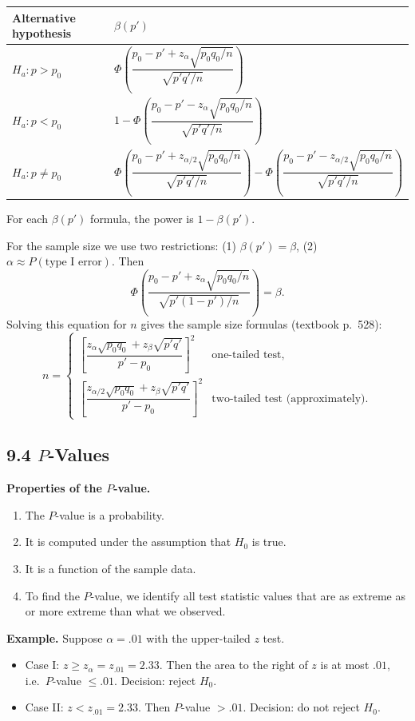 \begin{center}
\begin{tabular}{ll}
\toprule
Alternative hypothesis & $\beta(p')$\\
\midrule
$H_a:p>p_0$   & $\Phi\!\left(\dfrac{p_0-p'+z_\alpha\sqrt{p_0q_0/n}}{\sqrt{p'q'/n}}\right)$\\[3ex]
$H_a:p<p_0$   & $1-\Phi\!\left(\dfrac{p_0-p'-z_\alpha\sqrt{p_0q_0/n}}{\sqrt{p'q'/n}}\right)$\\[3ex]
$H_a:p\ne p_0$ & $\Phi\!\left(\dfrac{p_0-p'+z_{\alpha/2}\sqrt{p_0q_0/n}}{\sqrt{p'q'/n}}\right) - \Phi\!\left(\dfrac{p_0-p'-z_{\alpha/2}\sqrt{p_0q_0/n}}{\sqrt{p'q'/n}}\right)$\\
\bottomrule
\end{tabular}
\end{center}
For each $\beta(p')$ formula, the power is $1-\beta(p')$.

For the sample size we use two restrictions: (1) $\beta(p')=\beta$, (2) $\alpha\approx P(\text{type I error})$. Then
\[
\Phi\!\left(\frac{p_0-p'+z_\alpha\sqrt{p_0q_0/n}}{\sqrt{p'(1-p')/n}}\right)=\beta .
\]
Solving this equation for $n$ gives the sample size formulas (textbook p.~528):
\[
n = \begin{cases}
\left[\dfrac{z_\alpha\sqrt{p_0q_0}+z_\beta\sqrt{p'q'}}{p'-p_0}\right]^2 & \text{one-tailed test},\\[3ex]
\left[\dfrac{z_{\alpha/2}\sqrt{p_0q_0}+z_\beta\sqrt{p'q'}}{p'-p_0}\right]^2 & \text{two-tailed test (approximately)}.
\end{cases}
\]

\subsection*{9.4 $P$-Values}

\textbf{Properties of the $P$-value.}
\begin{enumerate}
  \item The $P$-value is a probability.
  \item It is computed under the assumption that $H_0$ is true.
  \item It is a function of the sample data.
  \item To find the $P$-value, we identify all test statistic values that are as extreme as or more extreme than what we observed.
\end{enumerate}

\textbf{Example.} Suppose $\alpha=.01$ with the upper-tailed $z$ test.
\begin{itemize}
  \item Case I: $z\ge z_\alpha = z_{.01}=2.33$. Then the area to the right of $z$ is at most $.01$, i.e.\ $P$-value $\le .01$. Decision: reject $H_0$.
  \item Case II: $z< z_{.01}=2.33$. Then $P$-value $>.01$. Decision: do not reject $H_0$.
\end{itemize}

